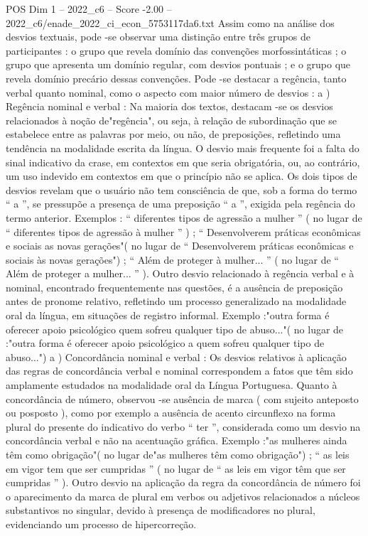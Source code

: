 \begin{textsample}{POS Dim 1 – 2022\_c6 – Score -2.00 – 2022\_c6/enade\_2022\_ci\_econ\_5753117da6.txt}
Assim como na análise dos desvios textuais, pode -se observar uma distinção entre três grupos de participantes : o grupo que revela domínio das convenções morfossintáticas ; o grupo que apresenta um domínio regular, com desvios pontuais ; e o grupo que revela domínio precário dessas convenções.
Pode -se destacar a regência, tanto verbal quanto nominal, como o aspecto com maior número de desvios : a ) Regência nominal e verbal : Na maioria dos textos, destacam -se os desvios relacionados à noção de"regência", ou seja, à relação de subordinação que se estabelece entre as palavras por meio, ou não, de preposições, refletindo uma tendência na modalidade escrita da língua.
O desvio mais frequente foi a falta do sinal indicativo da crase, em contextos em que seria obrigatória, ou, ao contrário, um uso indevido em contextos em que o princípio não se aplica.
Os dois tipos de desvios revelam que o usuário não tem consciência de que, sob a forma do termo “ a ”, se pressupõe a presença de uma preposição “ a ”, exigida pela regência do termo anterior.
Exemplos : “ diferentes tipos de agressão a mulher ” ( no lugar de “ diferentes tipos de agressão à mulher ” ) ; “ Desenvolverem práticas econômicas e sociais as novas gerações"( no lugar de “ Desenvolverem práticas econômicas e sociais às novas gerações") ; “ Além de proteger à mulher... ” ( no lugar de “ Além de proteger a mulher... ” ).
Outro desvio relacionado à regência verbal e à nominal, encontrado frequentemente nas questões, é a ausência de preposição antes de pronome relativo, refletindo um processo generalizado na modalidade oral da língua, em situações de registro informal.
Exemplo :"outra forma é oferecer apoio psicológico quem sofreu qualquer tipo de abuso..."( no lugar de :"outra forma é oferecer apoio psicológico a quem sofreu qualquer tipo de abuso...") a ) Concordância nominal e verbal : Os desvios relativos à aplicação das regras de concordância verbal e nominal correspondem a fatos que têm sido amplamente estudados na modalidade oral da Língua Portuguesa.
Quanto à concordância de número, observou -se ausência de marca ( com sujeito anteposto ou posposto ), como por exemplo a ausência de acento circunflexo na forma plural do presente do indicativo do verbo “ ter ”, considerada como um desvio na concordância verbal e não na acentuação gráfica.
Exemplo :"as mulheres ainda têm como obrigação"( no lugar de"as mulheres têm como obrigação") ; “ as leis em vigor tem que ser cumpridas ” ( no lugar de “ as leis em vigor têm que ser cumpridas ” ).
Outro desvio na aplicação da regra da concordância de número foi o aparecimento da marca de plural em verbos ou adjetivos relacionados a núcleos substantivos no singular, devido à presença de modificadores no plural, evidenciando um processo de hipercorreção.

\end{textsample}
